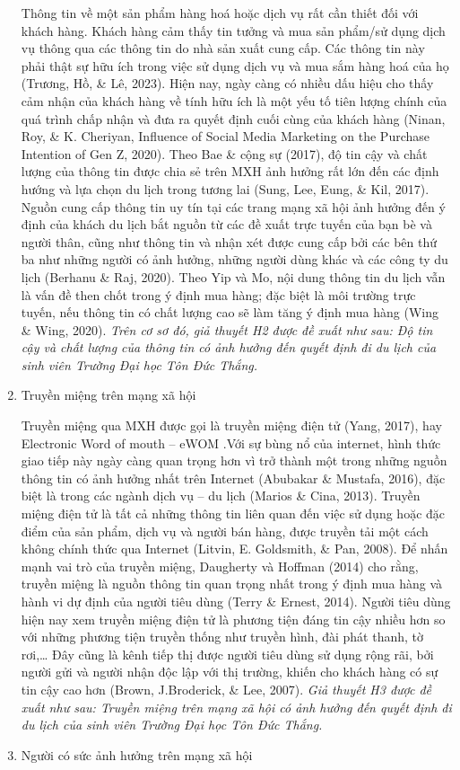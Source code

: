\begin{enumerate}[label = \alph*)]
			Thông tin về một sản phẩm hàng hoá hoặc dịch vụ rất cần thiết đối với khách hàng. Khách hàng cảm thấy tin tưởng và mua sản phẩm/sử dụng dịch vụ thông qua các thông tin do nhà sản xuất cung cấp. Các thông tin này phải thật sự hữu ích trong việc sử dụng dịch vụ và mua sắm hàng hoá của họ (Trương, Hồ, \& Lê, 2023). Hiện nay, ngày càng có nhiều dấu hiệu cho thấy cảm nhận của khách hàng về tính hữu ích là một yếu tố tiên lượng chính của quá trình chấp nhận và đưa ra quyết định cuối cùng của khách hàng (Ninan, Roy, \& K. Cheriyan, Influence of Social Media Marketing on the Purchase Intention of Gen Z, 2020). Theo Bae \& cộng sự (2017), độ tin cậy và chất lượng của thông tin được chia sẻ trên MXH ảnh hưởng rất lớn đến các định hướng và lựa chọn du lịch trong tương lai (Sung, Lee, Eung, \& Kil, 2017). Nguồn cung cấp thông tin uy tín tại các trang mạng xã hội ảnh hưởng đến ý định của khách du lịch bắt nguồn từ các đề xuất trực tuyến của bạn bè và người thân, cũng như thông tin và nhận xét được cung cấp bởi các bên thứ ba như những người có ảnh hưởng, những người dùng khác và các công ty du lịch (Berhanu \& Raj, 2020). Theo Yip và Mo, nội dung thông tin du lịch vẫn là vấn đề then chốt trong ý định mua hàng; đặc biệt là môi trường trực tuyến, nếu thông tin có chất lượng cao sẽ làm tăng ý định mua hàng (Wing \& Wing, 2020). \textit{Trên cơ sơ đó, giả thuyết H2 được đề xuất như sau: Độ tin cậy và chất lượng của thông tin có ảnh hưởng đến quyết định đi du lịch của sinh viên Trường Đại học Tôn Đức Thắng.}
			\item Truyền miệng trên mạng xã hội
			
			Truyền miệng qua MXH được gọi là truyền miệng điện tử (Yang, 2017), hay Electronic Word of mouth – eWOM .Với sự bùng nổ của internet, hình thức giao tiếp này ngày càng quan trọng hơn vì trở thành một trong những nguồn thông tin có ảnh hưởng nhất trên Internet (Abubakar \& Mustafa, 2016), đặc biệt là trong các ngành dịch vụ – du lịch (Marios \& Cina, 2013). Truyền miệng điện tử là tất cả những thông tin liên quan đến việc sử dụng hoặc đặc điểm của sản phẩm, dịch vụ và người bán hàng, được truyền tải một cách không chính thức qua Internet (Litvin, E. Goldsmith, \& Pan, 2008). Để nhấn mạnh vai trò của truyền miệng, Daugherty và Hoffman (2014) cho rằng, truyền miệng là nguồn thông tin quan trọng nhất trong ý định mua hàng và hành vi dự định của người tiêu dùng (Terry \& Ernest, 2014). Người tiêu dùng hiện nay xem truyền miệng điện tử là phương tiện đáng tin cậy nhiều hơn so với những phương tiện truyền thống như truyền hình, đài phát thanh, tờ rơi,… Đây cũng là kênh tiếp thị được người tiêu dùng sử dụng rộng rãi, bởi người gửi và người nhận độc lập với thị trường, khiến cho khách hàng có sự tin cậy cao hơn (Brown, J.Broderick, \& Lee, 2007). \textit{Giả thuyết H3 được đề xuất như sau: Truyền miệng trên mạng xã hội có ảnh hưởng đến quyết định đi du lịch của sinh viên Trường Đại học Tôn Đức Thắng.}
			\item Người có sức ảnh hưởng trên mạng xã hội
			

\end{enumerate}

